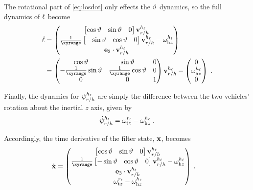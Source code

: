 The rotational part of \eqref{eq:losdot} only effects the $\bearing$ dynamics, so the full dynamics of $\los$ become
\begin{align}
    \los[\dot] &= \begin{pmatrix}
        \begin{bmatrix} \cos\bearing & \sin\bearing & 0 \end{bmatrix} \vel_{\TwrtH}^\hv   \\
        \frac{1}{\xyrange} \begin{bmatrix} -\sin\bearing & \cos\bearing & 0 \end{bmatrix} \vel_{\TwrtH}^\hv  - \angvel_{\text{h}z}^\hv \\
        \e_3 \cdot \vel_{\TwrtH}^\hv
        \end{pmatrix} \\
    &= \begin{pmatrix}
    \cos\bearing & \sin\bearing & 0 \\
    -\frac{1}{\xyrange}\sin\bearing & \frac{1}{\xyrange}\cos\bearing & 0 \\
    0 & 0 & 1
    \end{pmatrix} \vel_{\TwrtH}^\hv - \begin{pmatrix} 0 \\ \angvel_{\text{h}z}^\hv \\ 0 \end{pmatrix} \;.
\end{align}

Finally, the dynamics for $\relpsifull$ are simply the difference between the two vehicles' rotation about the inertial $z$ axis, given by
\begin{equation}
    \relpsifull[\dot] = \angvel_{\text{t}z}^\tv - \angvel_{\text{h}z}^\hv \;.
\end{equation}

Accordingly, the time derivative of the filter state, $\x$, becomes
\begin{align} \label{eq:pf_xdot}
\xdot &= \begin{pmatrix}
        \begin{bmatrix} \cos\bearing & \sin\bearing & 0 \end{bmatrix} \vel_{\TwrtH}^\hv   \\
        \frac{1}{\xyrange} \begin{bmatrix} -\sin\bearing & \cos\bearing & 0 \end{bmatrix} \vel_{\TwrtH}^\hv  - \angvel_{\text{h}z}^\hv \\
        \e_3 \cdot \vel_{\TwrtH}^\hv \\
        \angvel_{\text{t}z}^\tv - \angvel_{\text{h}z}^\hv
        \end{pmatrix} \;.
\end{align}

